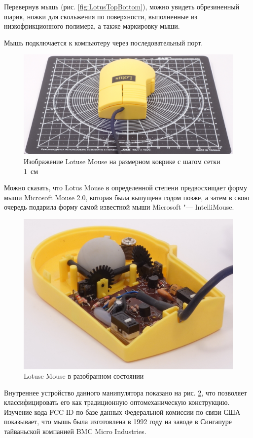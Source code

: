 \documentclass[11pt, a4paper]{article}
\begin{document}
Перевернув мышь (рис. \ref{fig:LotusTopBottom}), можно увидеть обрезиненный шарик, ножки для скольжения по поверхности, выполненные из низкофрикционного полимера, а также маркировку мыши.

Мышь подключается к компьютеру через последовательный порт.

\begin{figure}[h]
    \centering
    \includegraphics[scale=0.3]{1992_lotus_mouse/mis4.jpg}
    \caption{Изображение Lotuse Mouse на размерном коврике с шагом сетки 1~см}
    \label{fig:LotusSize}
\end{figure}

Можно сказать, что Lotus Mouse в определенной степени предвосхищает форму мыши Microsoft Mouse 2.0, которая была выпущена годом позже, а затем в свою очередь подарила форму самой известной мыши Microsoft "--- IntelliMouse.

\begin{figure}[h]
    \centering
    \includegraphics[scale=0.6]{1992_lotus_mouse/razob2.jpg}
    \caption{Lotuse Mouse в разобранном состоянии}
    \label{fig:LotusInside}
\end{figure}

Внутреннее устройство данного манипулятора показано на рис. \ref{fig:LotusInside}, что позволяет классифицировать его как традиционную оптомеханическую конструкцию. Изучение кода FCC ID по базе данных Федеральной комиссии по связи США показывает, что мышь была изготовлена в 1992 году на заводе в Сингапуре тайваньской компанией BMC Micro Industries.
\end{document}
